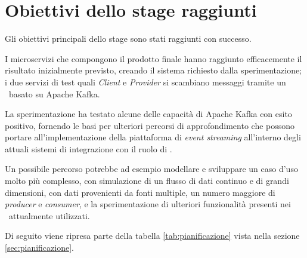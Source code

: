 \section{Obiettivi dello stage raggiunti}

Gli obiettivi principali dello stage sono stati raggiunti con successo.

I microservizi che compongono il prodotto finale hanno raggiunto efficacemente il risultato inizialmente previsto, creando il sistema richiesto dalla sperimentazione; i due servizi di test quali  \textit{Client} e  \textit{Provider} si scambiano messaggi tramite un \middleware\ basato su Apache Kafka.

La sperimentazione ha testato alcune delle capacità di Apache Kafka con esito positivo, fornendo le basi per ulteriori percorsi di approfondimento che possono portare all'implementazione della piattaforma di \textit{event streaming} all'interno degli attuali sistemi di integrazione con il ruolo di \middleware.

Un possibile percorso potrebbe ad esempio modellare e sviluppare un caso d'uso molto più complesso, con simulazione di un flusso di dati continuo e di grandi dimensioni, con dati provenienti da fonti multiple, un numero maggiore di \textit{producer} e \textit{consumer}, e la sperimentazione di ulteriori funzionalità presenti nei \middleware\ attualmente utilizzati.

\noindent
Di seguito viene ripresa parte della tabella \ref{tab:pianificazione} vista nella sezione \ref{sec:pianificazione}.

